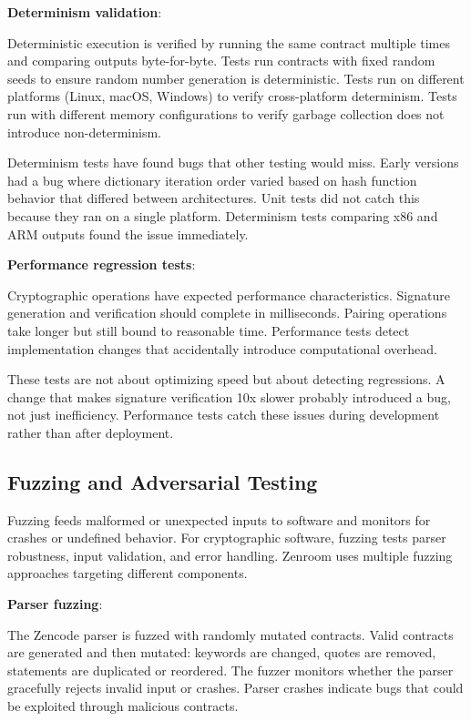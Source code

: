 \textbf{Determinism validation}:

Deterministic execution is verified by running the same contract
multiple times and comparing outputs byte-for-byte. Tests run
contracts with fixed random seeds to ensure random number generation
is deterministic. Tests run on different platforms (Linux, macOS,
Windows) to verify cross-platform determinism. Tests run with
different memory configurations to verify garbage collection does not
introduce non-determinism.

Determinism tests have found bugs that other testing would miss. Early
versions had a bug where dictionary iteration order varied based on
hash function behavior that differed between architectures. Unit tests
did not catch this because they ran on a single platform. Determinism
tests comparing x86 and ARM outputs found the issue immediately.

\textbf{Performance regression tests}:

Cryptographic operations have expected performance
characteristics. Signature generation and verification should complete
in milliseconds. Pairing operations take longer but still bound to
reasonable time. Performance tests detect implementation changes that
accidentally introduce computational overhead.

These tests are not about optimizing speed but about detecting
regressions. A change that makes signature verification 10x slower
probably introduced a bug, not just inefficiency. Performance tests
catch these issues during development rather than after deployment.

\subsection{Fuzzing and Adversarial Testing}

Fuzzing feeds malformed or unexpected inputs to software and monitors
for crashes or undefined behavior. For cryptographic software, fuzzing
tests parser robustness, input validation, and error handling. Zenroom
uses multiple fuzzing approaches targeting different components.

\textbf{Parser fuzzing}:

The Zencode parser is fuzzed with randomly mutated contracts. Valid
contracts are generated and then mutated: keywords are changed, quotes
are removed, statements are duplicated or reordered. The fuzzer
monitors whether the parser gracefully rejects invalid input or
crashes. Parser crashes indicate bugs that could be exploited through
malicious contracts.

